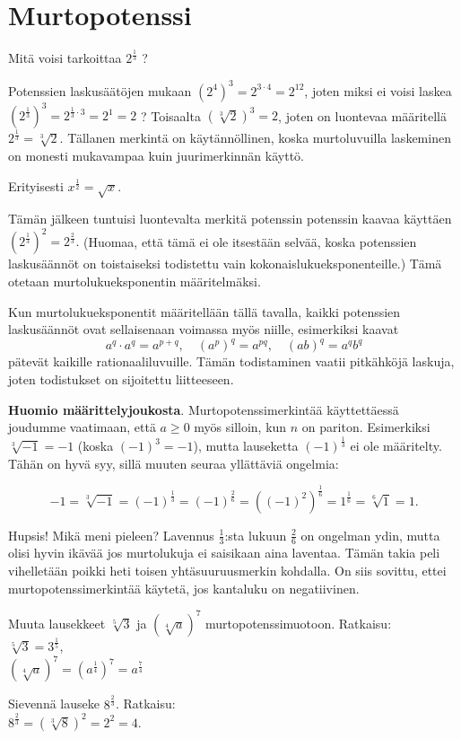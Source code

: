 \chapter{Murtopotenssi}

Mitä voisi tarkoittaa $2^\frac{1}{3}$ ?

Potenssien laskusäätöjen mukaan $(2^4)^3 = 2^{3\cdot 4} = 2^{12}$, joten miksi ei voisi laskea $\left( 2^{\frac{1}{3}}\right)^3 = 2^{\frac{1}{3}\cdot 3} = 2^1=2$ ? Toisaalta $(\sqrt[3]{2})^3=2$, joten on luontevaa määritellä $2^{\frac{1}{3}} = \sqrt[3]{2}$. Tällanen merkintä on käytännöllinen, koska murtoluvuilla laskeminen on monesti mukavampaa kuin juurimerkinnän käyttö.


Erityisesti $x^\frac{1}{2}=\sqrt{x}$.

Tämän jälkeen tuntuisi luontevalta merkitä potenssin potenssin kaavaa käyttäen $(2^{\frac{1}{3}})^2 = 2^{\frac{2}{3}}.$ (Huomaa, että tämä ei ole itsestään selvää, koska potenssien laskusäännöt on toistaiseksi todistettu vain kokonaislukueksponenteille.) Tämä otetaan murtolukueksponentin määritelmäksi.


Kun murtolukueksponentit määritellään tällä tavalla, kaikki potenssien
laskusäännöt ovat sellaisenaan voimassa myös niille, esimerkiksi kaavat
\[ a^q\cdot a^q = a^{p+q}, \quad (a^p)^q = a^{pq}, \quad (ab)^q=a^qb^q \]
pätevät kaikille rationaaliluvuille. Tämän todistaminen vaatii pitkähköjä
laskuja, joten todistukset on sijoitettu liitteeseen.

{\bf Huomio määrittelyjoukosta}. Murtopotenssimerkintää käyttettäessä joudumme vaatimaan, että $a\geq 0$ myös silloin, kun $n$ on pariton. Esimerkiksi $\sqrt[3]{-1}=-1$ (koska $(-1)^3=-1$), mutta lauseketta $(-1)^\frac{1}{3}$ ei ole määritelty. Tähän on hyvä syy, sillä muuten seuraa yllättäviä ongelmia:

\[ -1 = \sqrt[3]{-1} = (-1)^\frac{1}{3} = (-1)^\frac{2}{6}
= ((-1)^2)^\frac{1}{6} = 1^\frac{1}{6} = \sqrt[6]{1} = 1. \]

Hupsis! Mikä meni pieleen? Lavennus $\frac{1}{3}$:sta lukuun $\frac{2}{6}$ on ongelman ydin, mutta olisi hyvin ikävää jos murtolukuja ei saisikaan aina laventaa. Tämän takia peli vihelletään poikki
heti toisen yhtäsuuruusmerkin kohdalla. On siis sovittu, ettei
murtopotenssimerkintää käytetä, jos kantaluku on negatiivinen.

\begin{esimerkki}
Muuta lausekkeet $\sqrt[5]{3}$ ja $(\sqrt[4]{a})^7$ murtopotenssimuotoon. Ratkaisu: \\
$\sqrt[5]{3} = 3^\frac{1}{5}$, \\
$(\sqrt[4]{a})^7 = (a^\frac{1}{4})^7=a^\frac{7}{4}$
\end{esimerkki}

\begin{esimerkki}
Sievennä lauseke $8^\frac{2}{3}$. Ratkaisu: \\
 $8^\frac{2}{3} = (\sqrt[3]{8})^2 = 2^2 = 4.$
\end{esimerkki}